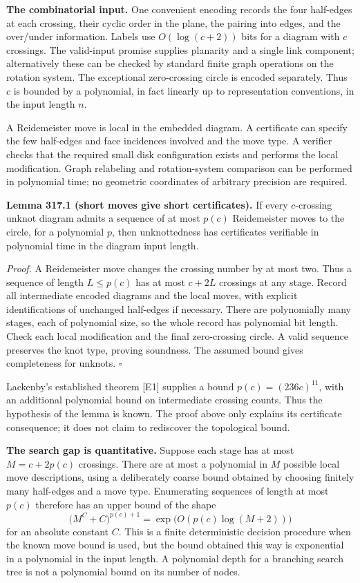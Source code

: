 \documentclass[11pt]{article}
\begin{document}
\textbf{The combinatorial input.} One convenient encoding records the four half-edges at each crossing, their cyclic order in the plane, the pairing into edges, and the over/under information. Labels use $O(\log(c+2))$ bits for a diagram with $c$ crossings. The valid-input promise supplies planarity and a single link component; alternatively these can be checked by standard finite graph operations on the rotation system. The exceptional zero-crossing circle is encoded separately. Thus $c$ is bounded by a polynomial, in fact linearly up to representation conventions, in the input length $n$.

A Reidemeister move is local in the embedded diagram. A certificate can specify the few half-edges and face incidences involved and the move type. A verifier checks that the required small disk configuration exists and performs the local modification. Graph relabeling and rotation-system comparison can be performed in polynomial time; no geometric coordinates of arbitrary precision are required.

\textbf{Lemma 317.1 (short moves give short certificates).} If every $c$-crossing unknot diagram admits a sequence of at most $p(c)$ Reidemeister moves to the circle, for a polynomial $p$, then unknottedness has certificates verifiable in polynomial time in the diagram input length.

\emph{Proof.} A Reidemeister move changes the crossing number by at most two. Thus a sequence of length $L\leq p(c)$ has at most $c+2L$ crossings at any stage. Record all intermediate encoded diagrams and the local moves, with explicit identifications of unchanged half-edges if necessary. There are polynomially many stages, each of polynomial size, so the whole record has polynomial bit length. Check each local modification and the final zero-crossing circle. A valid sequence preserves the knot type, proving soundness. The assumed bound gives completeness for unknots. $\square$

Lackenby's established theorem [E1] supplies a bound $p(c)=(236c)^{11}$, with an additional polynomial bound on intermediate crossing counts. Thus the hypothesis of the lemma is known. The proof above only explains its certificate consequence; it does not claim to rediscover the topological bound.

\textbf{The search gap is quantitative.} Suppose each stage has at most $M=c+2p(c)$ crossings. There are at most a polynomial in $M$ possible local move descriptions, using a deliberately coarse bound obtained by choosing finitely many half-edges and a move type. Enumerating sequences of length at most $p(c)$ therefore has an upper bound of the shape
\[
 \bigl(M^C+C\bigr)^{p(c)+1}
      =\exp\bigl(O(p(c)\log(M+2))\bigr)
 \tag{317.1}
\]
for an absolute constant $C$. This is a finite deterministic decision procedure when the known move bound is used, but the bound obtained this way is exponential in a polynomial in the input length. A polynomial depth for a branching search tree is not a polynomial bound on its number of nodes.
\end{document}
